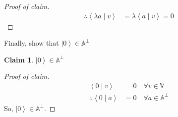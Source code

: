 \documentclass{exam} %
\newcommand{\m}[1]{\mathbb{#1}}    %
\theoremstyle{plain}
\newtheorem{claim}[thm]{Claim}      \newtheorem*{claim*}{Claim}
\theoremstyle{definition}
\theoremstyle{remark}
\newenvironment{claimproof} {
  \begin{proof}[Proof of claim]
  \renewcommand{\qedsymbol}{\ensuremath{\circ}}
  } {
  \end{proof}
  }
\numberwithin{equation}{section}  %
\newcommand{\ket}[1]{ \left| #1 \right> }
\newcommand{\bracket}[2]{ \left< #1 \mid #2 \right> }
\begin{document}
\begin{questions}
\begin{parts}
\begin{solution}
\begin{claimproof}
\begin{align*}
        \therefore \bracket{\lambda a}{v} &= \lambda\bracket{a}{v} = 0
      \end{align*}
    \end{claimproof}
    Finally, show that $\ket{0}\in\m{A}^\perp$
    \begin{claim}$\ket{0}\in\m{A}^\perp$\end{claim}
    \begin{claimproof}
      \begin{align*}
        \bracket{0}{v} &= 0 \quad \forall v \in \m{V}\\
        \therefore \bracket{0}{a} &= 0 \quad \forall a \in \m{A}^\perp
      \end{align*}
      So, $\ket{0} \in \m{A}^\perp$.
    \end{claimproof}
  \end{solution}

\end{parts}
\end{questions}
\end{document}
